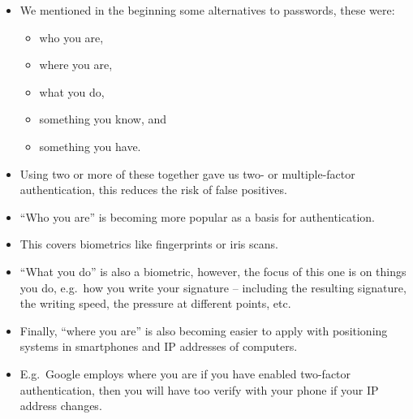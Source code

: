 \documentclass{beamer}
\begin{document}
\begin{frame}
  \begin{itemize}
    \item We mentioned in the beginning some alternatives to passwords, these 
      were:
      \begin{itemize}
        \item who you are,
        \item where you are,
        \item what you do,
        \item something you know, and
        \item something you have.
      \end{itemize}

    \item Using two or more of these together gave us two- or multiple-factor 
      authentication, this reduces the risk of false positives.

  \end{itemize}
\end{frame}

\begin{frame}
  \begin{itemize}
    \item ``Who you are'' is becoming more popular as a basis for 
      authentication.

    \item This covers biometrics like fingerprints or iris scans.

    \item ``What you do'' is also a biometric, however, the focus of this one 
      is on things you do, e.g.\ how you write your signature -- including the 
      resulting signature, the writing speed, the pressure at different points, 
      etc.

    \item Finally, ``where you are'' is also becoming easier to apply with 
      positioning systems in smartphones and IP addresses of computers.

    \item E.g.\ Google employs where you are if you have enabled two-factor 
      authentication, then you will have too verify with your phone if your IP 
      address changes.
  \end{itemize}
\end{frame}
\end{document}

